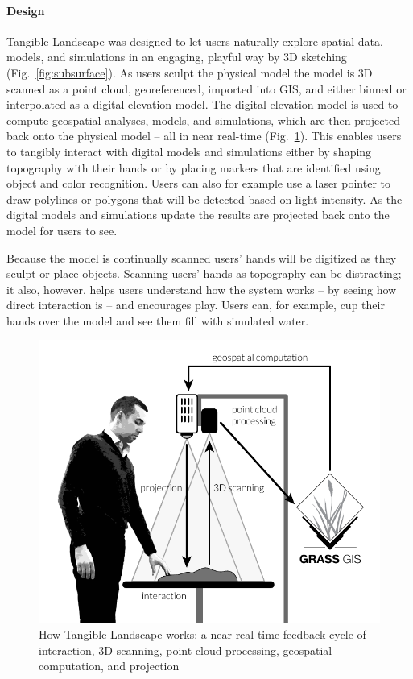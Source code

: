\documentclass[prodmode,acmtochi]{acmsmall} %
\begin{document}


\paragraph{Design}
Tangible Landscape was designed to let users naturally explore 
spatial data, models, and simulations in an engaging, playful way
by 3D sketching (Fig.~\ref{fig:subsurface}).
%
As users sculpt the physical model
the model is 3D scanned as a point cloud, georeferenced, imported into GIS, 
and either binned or interpolated as a digital elevation model. 
The digital elevation model is used to compute 
geospatial analyses, models, and simulations, 
which are then projected back onto the physical model 
-- all in near real-time (Fig.~\ref{fig:system_schema}). 
%
This enables users to tangibly interact with digital models and simulations
either by shaping topography with their hands or
by placing markers that are identified using object and color recognition.
%
Users can also for example use a laser pointer to draw polylines or polygons
that will be detected based on light intensity.
%
As the digital models and simulations update
the results are projected back onto the model for users to see. 

Because the model is continually scanned
users' hands will be digitized as they sculpt or place objects. 
%
Scanning users' hands as topography can be distracting; 
it also, however, helps users understand how the system works
-- by seeing how direct interaction is --
and encourages play. 
Users can, for example, cup their hands over the model 
and see them fill with simulated water. 

\begin{figure}[h!]
\begin{center}
		\includegraphics{images/system_schema.pdf}
	\caption{How Tangible Landscape works: a near real-time feedback cycle of interaction, 3D scanning, point cloud processing, geospatial computation, and projection}
	\label{fig:system_schema}
\end{center}
\end{figure}
\end{document}
